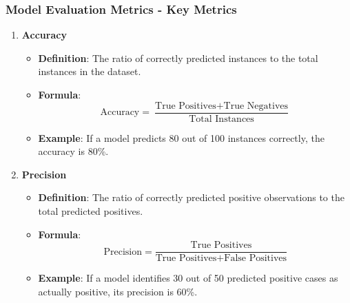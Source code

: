 \documentclass[aspectratio=169]{beamer}
\begin{document}
\begin{frame}[fragile]
    \frametitle{Model Evaluation Metrics - Key Metrics}
    \begin{enumerate}
        \item \textbf{Accuracy}
            \begin{itemize}
                \item \textbf{Definition}: The ratio of correctly predicted instances to the total instances in the dataset.
                \item \textbf{Formula}:
                \[
                \text{Accuracy} = \frac{\text{True Positives} + \text{True Negatives}}{\text{Total Instances}}
                \]
                \item \textbf{Example}: If a model predicts 80 out of 100 instances correctly, the accuracy is 80\%.
            \end{itemize}
        
        \item \textbf{Precision}
            \begin{itemize}
                \item \textbf{Definition}: The ratio of correctly predicted positive observations to the total predicted positives.
                \item \textbf{Formula}:
                \[
                \text{Precision} = \frac{\text{True Positives}}{\text{True Positives} + \text{False Positives}}
                \]
                \item \textbf{Example}: If a model identifies 30 out of 50 predicted positive cases as actually positive, its precision is 60\%.
            \end{itemize}
    \end{enumerate}
\end{frame}
\end{document}
